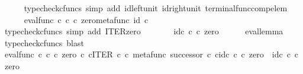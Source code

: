 \begin{isabellebody}
\ \ \ \ \isamarkupfalse%
\ {\isacharparenleft}{\kern0pt}typecheck{\isacharunderscore}{\kern0pt}cfuncs{\isacharcomma}{\kern0pt}\ simp\ add{\isacharcolon}{\kern0pt}\ id{\isacharunderscore}{\kern0pt}left{\isacharunderscore}{\kern0pt}unit{}\ id{\isacharunderscore}{\kern0pt}right{\isacharunderscore}{\kern0pt}unit{}\ terminal{\isacharunderscore}{\kern0pt}func{\isacharunderscore}{\kern0pt}comp{\isacharunderscore}{\kern0pt}elem{\isacharparenright}{\kern0pt}\isanewline
\ \ \isamarkupfalse%
\ \isamarkupfalse%
\ {\isachardoublequoteopen}{\isachardot}{\kern0pt}{\isachardot}{\kern0pt}{\isachardot}{\kern0pt}\ {\isacharequal}{\kern0pt}\ \ eval{\isacharunderscore}{\kern0pt}func\ {\isasymnat}\isactrlsub c\ {\isasymnat}\isactrlsub c\ {\isasymcirc}\isactrlsub c\ {\isasymlangle}zero{\isacharcomma}{\kern0pt}metafunc\ {\isacharparenleft}{\kern0pt}id\ {\isasymnat}\isactrlsub c{\isacharparenright}{\kern0pt}\ {\isasymrangle}{\isachardoublequoteclose}\isanewline
\ \ \ \ \isamarkupfalse%
\ {\isacharparenleft}{\kern0pt}typecheck{\isacharunderscore}{\kern0pt}cfuncs{\isacharcomma}{\kern0pt}\ simp\ add{\isacharcolon}{\kern0pt}\ ITER{\isacharunderscore}{\kern0pt}zero{\isacharprime}{\kern0pt}{\isacharparenright}{\kern0pt}\isanewline
\ \ \isamarkupfalse%
\ \isamarkupfalse%
\ {\isachardoublequoteopen}{\isachardot}{\kern0pt}{\isachardot}{\kern0pt}{\isachardot}{\kern0pt}\ {\isacharequal}{\kern0pt}\ id\isactrlsub c\ {\isasymnat}\isactrlsub c\ {\isasymcirc}\isactrlsub c\ zero{\isachardoublequoteclose}\isanewline
\ \ \ \ \isamarkupfalse%
\ eval{\isacharunderscore}{\kern0pt}lemma\ \isamarkupfalse%
\ {\isacharparenleft}{\kern0pt}typecheck{\isacharunderscore}{\kern0pt}cfuncs{\isacharcomma}{\kern0pt}\ blast{\isacharparenright}{\kern0pt}\isanewline
\ \ \isamarkupfalse%
\ \isamarkupfalse%
\ {\isachardoublequoteopen}{\isacharparenleft}{\kern0pt}eval{\isacharunderscore}{\kern0pt}func\ {\isasymnat}\isactrlsub c\ {\isasymnat}\isactrlsub c\ {\isasymcirc}\isactrlsub c\ {\isasymlangle}zero\ {\isasymcirc}\isactrlsub c\ {\isasymbeta}\isactrlbsub {\isasymnat}\isactrlsub c\isactrlesub {\isacharcomma}{\kern0pt}ITER\ {\isasymnat}\isactrlsub c\ {\isasymcirc}\isactrlsub c\ {\isasymlangle}metafunc\ successor\ {\isasymcirc}\isactrlsub c\ {\isasymbeta}\isactrlbsub {\isasymnat}\isactrlsub c\isactrlesub {\isacharcomma}{\kern0pt}id\isactrlsub c\ {\isasymnat}\isactrlsub c{\isasymrangle}{\isasymrangle}{\isacharparenright}{\kern0pt}\ {\isasymcirc}\isactrlsub c\ zero\ {\isacharequal}{\kern0pt}\ id\isactrlsub c\ {\isasymnat}\isactrlsub c\ {\isasymcirc}\isactrlsub c\ zero{\isachardoublequoteclose}\isanewline

\end{isabellebody}

